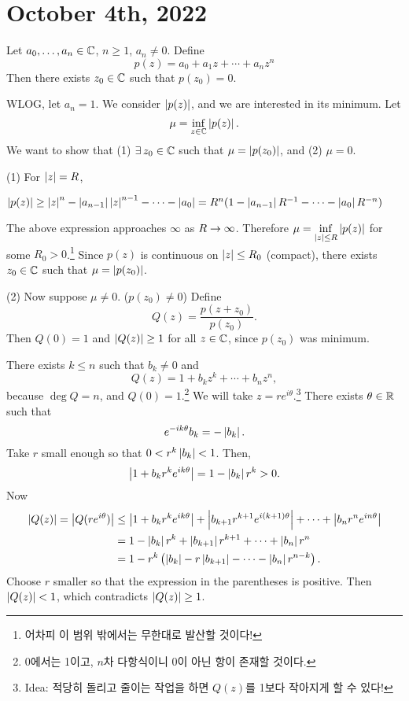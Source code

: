 \section*{October 4th, 2022}



  Let \(a_0, \dots, a_n \in \mathbb{C}\), \(n \geq 1\), \(a_n \neq 0\). Define
\[
    p(z) = a_0 + a_1 z + \cdots + a_n z^n
\]
Then there exists \(z_0 \in \mathbb{C}\) such that \(p(z_0) = 0\).

\pf WLOG, let \(a_n = 1\). We consider \(\left| p(z) \right|\), and we are interested in its minimum. Let
\[
    \mu = \inf_{z \in \mathbb{C}} \left| p(z) \right|.
\]
We want to show that (1) \(\exists z_0 \in \C\) such that \(\mu = \left| p(z_0) \right|\), and (2) \(\mu = 0\).

(1) For \(\left| z \right| = R\),
\begin{center}
    \(\left| p(z) \right| \geq \left| z \right|^n - \left| a_{n-1} \right|\left| z \right|^{n-1} - \cdots - \left| a_0 \right| = R^n(1-\left| a_{n-1} \right| R^{-1} - \cdots - \left| a_0 \right|R^{-n})\)
\end{center}
The above expression approaches \(\infty\) as \(R \rightarrow \infty\). Therefore \(\mu = \displaystyle \inf_{\left| z \right| \leq R} \left| p(z) \right|\) for some \(R_0 > 0\).\footnote{어차피 이 범위 밖에서는 무한대로 발산할 것이다!} Since \(p(z)\) is continuous on \(\left| z \right| \leq R_0\) (compact), there exists \(z_
0 \in \mathbb{C}\) such that \(\mu = \left| p(z_0) \right|\).

(2) Now suppose \(\mu \neq 0\). (\(p(z_0) \neq 0\)) Define
\[
    Q(z) = \frac{p(z + z_0)}{p(z_0)}.
\]
Then \(Q(0) = 1\) and \(\left| Q(z) \right| \geq 1\) for all \(z \in \mathbb{C}\), since \(p(z_0)\) was minimum.

There exists \(k \leq n\) such that \(b_k \neq 0\) and
\[
    Q(z) = 1 + b_k z^k + \cdots + b_n z^n,
\]
because \(\deg Q = n\), and \(Q(0) = 1\).\footnote{0에서는 1이고, \(n\)차 다항식이니 0이 아닌 항이 존재할 것이다.} We will take \(z = re^{i\theta}\).\footnote{Idea: 적당히 돌리고 줄이는 작업을 하면 \(Q(z)\)를 1보다 작아지게 할 수 있다!} There exists \(\theta \in \mathbb{R}\) such that
\[
    e^{-ik\theta} b_k = -\left| b_k \right|.
\]
Take \(r\) small enough so that \(0 < r^k \left| b_k \right| < 1\). Then,
\[
    \left| 1 + b_k r^ke^{ik\theta} \right| = 1 - \left| b_k \right|r^k > 0.
\]
Now
\[
    \begin{aligned}
        \left| Q(z) \right| = \left| Q(re^{i\theta}) \right| & \leq \left| 1 + b_kr^ke^{ik\theta} \right| + \left| b_{k+1} r^{k+1} e^{i(k+1)\theta} \right| + \cdots + \left| b_n r^n e^{in\theta} \right| \\
                                           & = 1 - \left| b_k \right|r^k + \left| b_{k+1} \right|r^{k+1} + \cdots + \left| b_n \right|r^n                                                \\
                                           & = 1 - r^k \left(\left| b_k \right| - r\left| b_{k+1} \right| - \cdots - \left| b_n \right|r^{n-k}\right).
    \end{aligned}
\]
Choose \(r\) smaller so that the expression in the parentheses is positive. Then \(\left| Q(z) \right| < 1\), which contradicts \(\left| Q(z) \right| \geq 1\).

